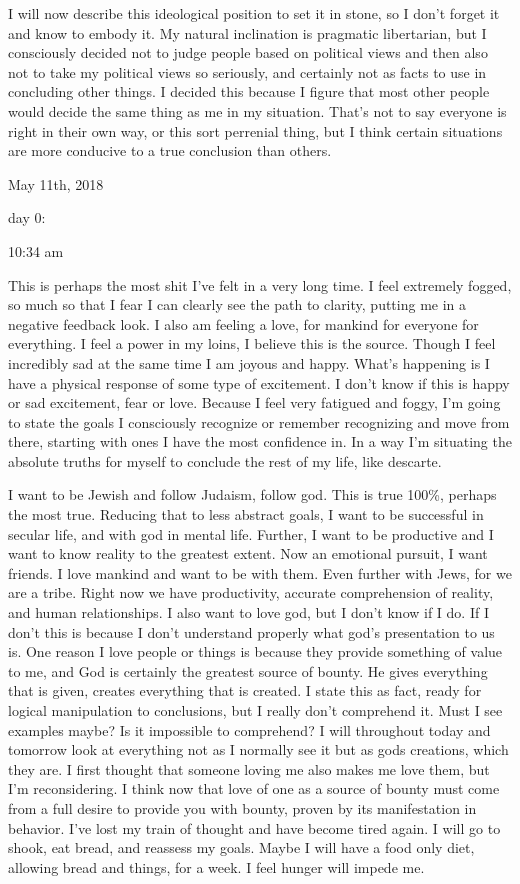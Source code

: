 I will now describe this ideological position to set it in stone, so I
don't forget it and know to embody it. My natural inclination is
pragmatic libertarian, but I consciously decided not to judge people
based on political views and then also not to take my political views so
seriously, and certainly not as facts to use in concluding other things.
I decided this because I figure that most other people would decide the
same thing as me in my situation. That's not to say everyone is right in
their own way, or this sort perrenial thing, but I think certain
situations are more conducive to a true conclusion than others.

\bigskip
\bigskip
May 11th, 2018

day 0:

10:34 am

This is perhaps the most shit I've felt in a very long time. I feel
extremely fogged, so much so that I fear I can clearly see the path to
clarity, putting me in a negative feedback look. I also am feeling a
love, for mankind for everyone for everything. I feel a power in my
loins, I believe this is the source. Though I feel incredibly sad at the
same time I am joyous and happy. What's happening is I have a physical
response of some type of excitement. I don't know if this is happy or
sad excitement, fear or love. Because I feel very fatigued and foggy,
I'm going to state the goals I consciously recognize or remember
recognizing and move from there, starting with ones I have the most
confidence in. In a way I'm situating the absolute truths for myself to
conclude the rest of my life, like descarte.

\qquad I want to be Jewish and follow Judaism, follow god. This is true
100\%, perhaps the most true. Reducing that to less abstract goals, I
want to be successful in secular life, and with god in mental life.
Further, I want to be productive and I want to know reality to the
greatest extent. Now an emotional pursuit, I want friends. I love
mankind and want to be with them. Even further with Jews, for we are a
tribe. Right now we have productivity, accurate comprehension of
reality, and human relationships. I also want to love god, but I don't
know if I do. If I don't this is because I don't understand properly
what god's presentation to us is. One reason I love people or things is
because they provide something of value to me, and God is certainly the
greatest source of bounty. He gives everything that is given, creates
everything that is created. I state this as fact, ready for logical
manipulation to conclusions, but I really don't comprehend it. Must I
see examples maybe? Is it impossible to comprehend? I will throughout
today and tomorrow look at everything not as I normally see it but as
gods creations, which they are. I first thought that someone loving me
also makes me love them, but I'm reconsidering. I think now that love of
one as a source of bounty must come from a full desire to provide you
with bounty, proven by its manifestation in behavior. I've lost my train
of thought and have become tired again. I will go to shook, eat bread,
and reassess my goals. Maybe I will have a food only diet, allowing
bread and things, for a week. I feel hunger will impede me.

